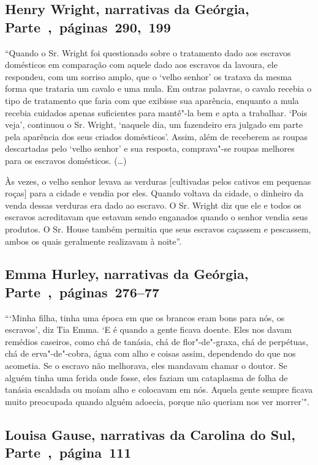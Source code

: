 \subsection{Henry Wright, narrativas da Geórgia, Parte~,~páginas~290,~199}
\label{ref319}

``Quando o Sr. Wright foi questionado sobre o tratamento dado aos
escravos domésticos em comparação com aquele dado aos escravos da
lavoura, ele respondeu, com um sorriso amplo, que o `velho senhor' os
tratava da mesma forma que trataria um cavalo e uma mula. Em outras
palavras, o cavalo recebia o tipo de tratamento que faria com que
exibisse sua aparência, enquanto a mula recebia cuidados apenas
suficientes para mantê"-la bem e apta a trabalhar. `Pois veja', continuou
o Sr. Wright, `naquele dia, um fazendeiro era julgado em parte pela
aparência dos seus criados domésticos'. Assim, além de receberem as
roupas descartadas pelo `velho senhor' e sua resposta, comprava"-se
roupas melhores para os escravos domésticos. (\ldots{})

Às vezes, o velho senhor levava as verduras {[}cultivadas pelos cativos
em pequenas roças{]} para a cidade e vendia por eles. Quando voltava da
cidade, o dinheiro da venda dessas verduras era dado ao escravo. O Sr.
Wright diz que ele e todos os escravos acreditavam que estavam sendo
enganados quando o senhor vendia seus produtos. O Sr. House também
permitia que seus escravos caçassem e pescassem, ambos os quais
geralmente realizavam à noite''.

\subsection{Emma Hurley, narrativas da Geórgia, Parte~,~páginas~276--77}
\label{ref159}

```Minha filha, tinha uma época em que os brancos eram bons para nós, os
escravos', diz Tia Emma. `E é quando a gente ficava doente. Eles nos
davam remédios caseiros, como chá de tanásia, chá de flor"-de"-graxa, chá
de perpétuas, chá de erva"-de"-cobra, água com alho e coisas assim,
dependendo do que nos acometia. Se o escravo não melhorava, eles
mandavam chamar o doutor. Se alguém tinha uma ferida onde fosse, eles
faziam um cataplasma de folha de tanásia escaldada ou moíam alho e
colocavam em nós. Aquela gente sempre ficava muito preocupada quando
alguém adoecia, porque não queriam nos ver morrer'".

\subsection{Louisa Gause, narrativas da Carolina do Sul, Parte~,~página~111} 
\label{ref103}

